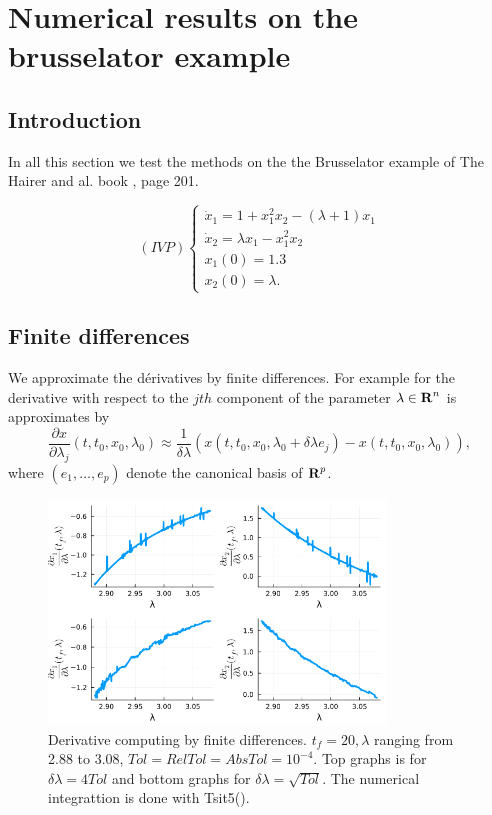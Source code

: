 \documentclass[a4paper,10pt]{article}
\newcommand\sizeFig{0.8}
\begin{document}
\section{Numerical results on the brusselator example}

\subsection{Introduction}

In all this section we test the methods on the the Brusselator example of The Hairer and al. book \cite{HaNoWa93}, page 201.

$$(IVP)\left\{\begin{array}{l}
\dot{x}_1 = 1+x_1^2x_2-(\lambda+1)x_1\\
\dot{x}_2 = \lambda x_1-x_1^2x_2\\
x_1(0) = 1.3\\
x_2(0) = \lambda.
\end{array}
\right.$$
\subsection{Finite differences}

We approximate the dérivatives by finite differences. For example for the derivative with respect to the $jth$ component of the  parameter $\lambda\in\mbox{$\mathbf{R}$}^n$ is approximates by
$$\frac{\partial x}{\partial \lambda_{j}}(t,t_0,x_0,\lambda_0)\approx\frac{1}{\delta\lambda}(x(t,t_0,x_0,\lambda_0+\delta\lambda e_j)-x(t,t_0,x_0,\lambda_0)),$$
where $(e_1,\ldots,e_p)$ denote the canonical basis of $\mbox{$\mathbf{R}$}^p$.


\begin{figure}[ht!]
    \includegraphics[width=\sizeFig\textwidth]{./figures/plot_END.png}

    \caption{Derivative computing by finite differences. $t_f=20, \lambda$ ranging from 2.88 to 3.08, $Tol=RelTol=AbsTol=10^{-4}$. Top graphs is for  $\delta\lambda=4Tol$ and bottom graphs for $\delta\lambda=\sqrt{Tol}$. The numerical integrattion is done with Tsit5().}
\end{figure}
\end{document}
